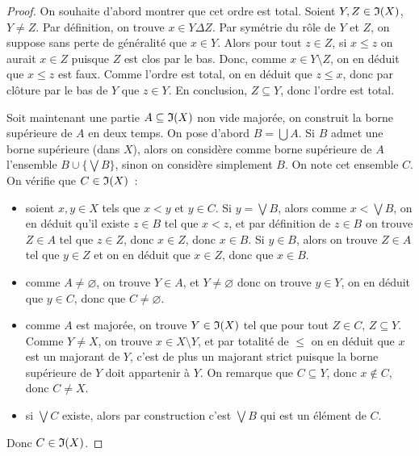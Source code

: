 \begin{proof}
  On souhaite d'abord montrer que cet ordre est total. Soient $Y,Z\in\mathfrak{I}(X)$,
  $Y\neq Z$. Par définition, on trouve $x\in Y\Delta Z$. Par symétrie du rôle de
  $Y$ et $Z$, on suppose sans perte de généralité que $x\in Y$. Alors pour tout
  $z\in Z$, si $x \leq z$ on aurait $x\in Z$ puisque $Z$ est clos par le bas.
  Donc, comme $x\in Y\setminus Z$, on en déduit que $x \leq z$ est faux. Comme
  l'ordre est total, on en déduit que $z\leq x$, donc par clôture par le bas de
  $Y$ que $z\in Y$. En conclusion, $Z\subseteq Y$, donc l'ordre est total.

  Soit maintenant une partie $A\subseteq \mathfrak{I}(X)$ non vide majorée, on
  construit la borne supérieure de $A$ en deux temps. On pose d'abord
  $B = \bigcup A$. Si $B$ admet une borne supérieure (dans $X$), alors on
  considère comme borne supérieure de $A$ l'ensemble $B \cup\{\bigvee B\}$,
  sinon on considère simplement $B$. On note cet ensemble $C$. On vérifie que
  $C\in \mathfrak{I}(X)$~:
  \begin{itemize}
  \item soient $x,y\in X$ tels que $x < y$ et $y\in C$. Si $y = \bigvee B$,
    alors comme $x < \bigvee B$, on en déduit qu'il existe $z \in B$ tel que
    $x < z$, et par définition de $z\in B$ on trouve $Z\in A$ tel que $z\in Z$,
    donc $x \in Z$, donc $x \in B$. Si $y \in B$, alors on trouve $Z\in A$ tel
    que $y \in Z$ et on en déduit que $x\in Z$, donc que $x \in B$.
  \item comme $A\neq \varnothing$, on trouve $Y\in A$, et $Y\neq\varnothing$
    donc on trouve $y\in Y$, on en déduit que $y\in C$, donc que
    $C\neq\varnothing$.
  \item comme $A$ est majorée, on trouve $Y \in \mathfrak{I}(X)$ tel que pour tout
    $Z\in C$, $Z\subseteq Y$. Comme $Y\neq X$, on trouve $x\in X\setminus Y$,
    et par totalité de $\leq$ on en déduit que $x$ est un majorant de $Y$, c'est
    de plus un majorant strict puisque la borne supérieure de $Y$ doit
    appartenir à $Y$. On remarque que $C\subseteq Y$, donc $x\notin C$, donc
    $C\neq X$.
  \item si $\bigvee C$ existe, alors par construction c'est $\bigvee B$ qui est
    un élément de $C$.
  \end{itemize}
  Donc $C\in\mathfrak{I}(X)$.


\end{proof}

